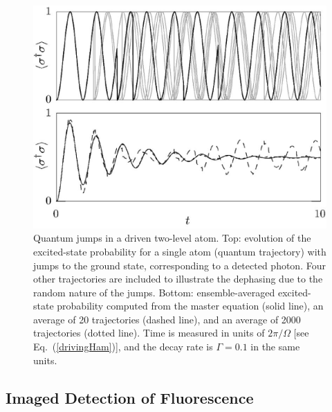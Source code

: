 \documentclass[aps,twocolumn,superscriptaddress,footinbib,floatfix,showpacs]{revtex4}
\begin{document}
\begin{figure}[tb]
  \begin{center}
     \includegraphics[width=1.0\hsize]{se-trajs-plot-mod.bmap.250.eps}
   \end{center}
  \vspace{-5mm}
  \caption
        {Quantum jumps in a driven two-level atom.
         Top: evolution of the excited-state probability
         for a single atom (quantum trajectory) with jumps to the ground state,
         corresponding to a detected photon.
         Four other trajectories are included to illustrate the
         dephasing due to the
         random nature of the jumps.
         Bottom: ensemble-averaged 
         excited-state probability computed from the 
         master equation (solid line), an
         average of 20 trajectories (dashed line), and an
         average of 2000 trajectories (dotted line).
         Time is measured in units of $2\pi/\Omega$ [see 
         Eq.~(\ref{drivingHam})],
         and the decay rate is $\Gamma=0.1$ in the same units.
	\label{fig:jumps}}
\end{figure}




\subsection{Imaged Detection of Fluorescence}
\end{document}
